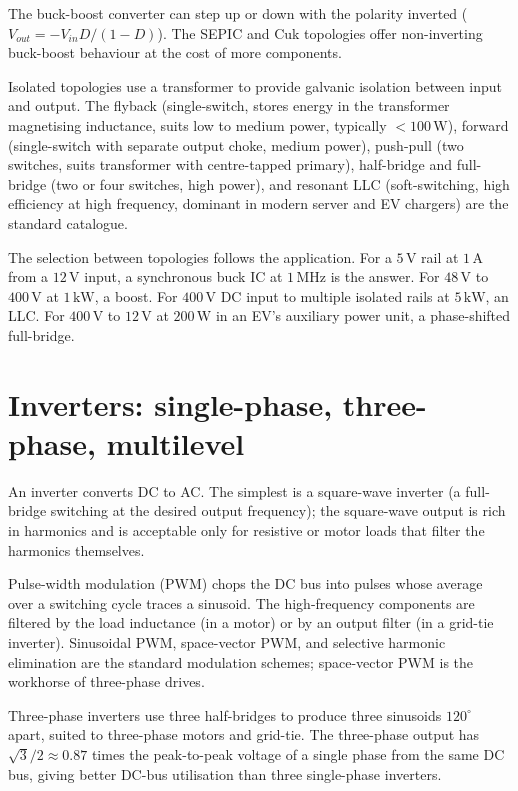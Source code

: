 The buck-boost converter can step up or down with the polarity inverted ($V_{out} = -V_{in} D/(1-D)$). The SEPIC and Cuk topologies offer non-inverting buck-boost behaviour at the cost of more components.

Isolated topologies use a transformer to provide galvanic isolation between input and output. The flyback (single-switch, stores energy in the transformer magnetising inductance, suits low to medium power, typically $< 100\,\text{W}$), forward (single-switch with separate output choke, medium power), push-pull (two switches, suits transformer with centre-tapped primary), half-bridge and full-bridge (two or four switches, high power), and resonant LLC (soft-switching, high efficiency at high frequency, dominant in modern server and EV chargers) are the standard catalogue.

The selection between topologies follows the application. For a $5\,\text{V}$ rail at $1\,\text{A}$ from a $12\,\text{V}$ input, a synchronous buck IC at $1\,\text{MHz}$ is the answer. For $48\,\text{V}$ to $400\,\text{V}$ at $1\,\text{kW}$, a boost. For $400\,\text{V}$ DC input to multiple isolated rails at $5\,\text{kW}$, an LLC. For $400\,\text{V}$ to $12\,\text{V}$ at $200\,\text{W}$ in an EV's auxiliary power unit, a phase-shifted full-bridge.

\section{Inverters: single-phase, three-phase, multilevel}

An inverter converts DC to AC. The simplest is a square-wave inverter (a full-bridge switching at the desired output frequency); the square-wave output is rich in harmonics and is acceptable only for resistive or motor loads that filter the harmonics themselves.

Pulse-width modulation (PWM) chops the DC bus into pulses whose average over a switching cycle traces a sinusoid. The high-frequency components are filtered by the load inductance (in a motor) or by an output filter (in a grid-tie inverter). Sinusoidal PWM, space-vector PWM, and selective harmonic elimination are the standard modulation schemes; space-vector PWM is the workhorse of three-phase drives.

Three-phase inverters use three half-bridges to produce three sinusoids $120^\circ$ apart, suited to three-phase motors and grid-tie. The three-phase output has $\sqrt{3}/2 \approx 0.87$ times the peak-to-peak voltage of a single phase from the same DC bus, giving better DC-bus utilisation than three single-phase inverters.

